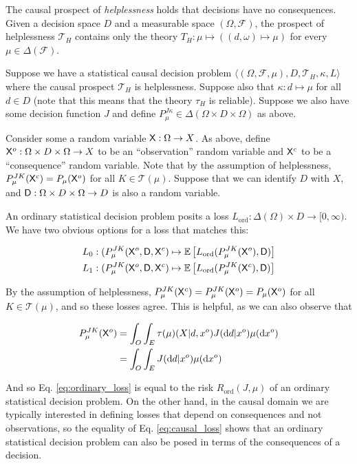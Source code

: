 \begin{example}[Helplessness]
The causal prospect of \emph{helplessness} holds that decisions have no consequences. Given a decision space $D$ and a measurable space $(\Omega,\mathcal{F})$, the prospect of helplessness $\mathscr{T}_H$ contains only the theory $T_H:\mu\mapsto ((d,\omega)\mapsto \mu)$ for every $\mu\in \Delta(\mathcal{F})$.
\end{example}

\begin{example}
Suppose we have a statistical causal decision problem $\langle (\Omega,\mathcal{F},\mu), D, \mathscr{T}_H,\kappa, L\rangle$ where the causal prospect $\mathscr{T}_H$ is helplessness. Suppose also that $\kappa:d\mapsto \mu$ for all $d\in D$ (note that this means that the theory $\tau_H$ is reliable). Suppose we also have some decision function $J$ and define $P^{J\kappa}_\mu \in \Delta(\Omega\times D\times \Omega)$ as above.

Consider some a random variable $\mathsf{X}: \Omega\to X$. As above, define $\mathsf{X}^o:\Omega\times D\times \Omega \to X$ to be an ``observation'' random variable and $\mathsf{X}^c$ to be a ``consequence'' random variable. Note that by the assumption of helplessness, $P^{J K}_\mu (\mathsf{X}^c) = P_\mu (\mathsf{X}^o)$ for all $K\in \mathscr{T}(\mu)$. Suppose that we can identify $D$ with $X$, and $\mathsf{D}:\Omega\times D\times \Omega\to D$ is also a random variable.

An ordinary statistical decision problem posits a loss $L_{\mathrm{ord}}:\Delta(\Omega)\times D\to [0,\infty)$. We have two obvious options for a loss that matches this:

\begin{align}
    L_0:(P^{J K}_\mu(\mathsf{X}^o,\mathsf{D},\mathsf{X}^c)&\mapsto \mathbb{E}\left[ L_{\mathrm{ord}}(P^{J K}_\mu(\mathsf{X}^o),\mathsf{D})\right] \label{eq:ordinary_loss}\\
    L_1:(P^{J K}_\mu(\mathsf{X}^o,\mathsf{D},\mathsf{X}^c)&\mapsto \mathbb{E}\left[ L_{\mathrm{ord}}(P^{J K}_\mu(\mathsf{X}^c),\mathsf{D})\right]\label{eq:causal_loss}
\end{align}

By the assumption of helplessness, $P^{J K}_\mu(\mathsf{X}^c)=P^{J K}_\mu(\mathsf{X}^o)=P_\mu(\mathsf{X}^o)$ for all $K\in \mathscr{T}(\mu)$, and so these losses agree. This is helpful, as we can also observe that

\begin{align}
    P^{J K}_\mu(\mathsf{X}^o) &= \int_O \int_E  \tau(\mu)(X |d,x^o) J(\mathrm{d}d|x^o) \mu(\mathrm{d}x^o) \\
                                 &= \int_O \int_E  J(\mathrm{d}d|x^o) \mu(\mathrm{d}x^o)
\end{align}

And so Eq. \ref{eq:ordinary_loss} is equal to the risk $R_{\mathrm{ord}}(J,\mu)$ of an ordinary statistical decision problem. On the other hand, in the causal domain we are typically interested in defining losses that depend on consequences and not observations, so the equality of Eq. \ref{eq:causal_loss} shows that an ordinary statistical decision problem can also be posed in terms of the consequences of a decision.
\end{example}

